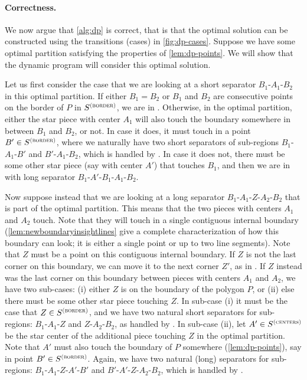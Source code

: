 \documentclass[10pt,a4paper]{article}
\newcommand\Scen{S^{\textsc{(centers)}}}
\newcommand\Sbor{S^{\textsc{(border)}}}
\begin{document}
\paragraph{Correctness.}
We now argue that \cref{alg:dp} is correct, that is that the optimal solution can be constructed using the transitions (cases) in \cref{fig:dp-cases}.
Suppose we have some optimal partition satisfying the properties of \cref{lem:dp-points}. We will show that the dynamic program will consider this optimal solution.

Let us first consider the case that we are looking at a short separator $B_1$-$A_1$-$B_2$ in this optimal partition. If either $B_1 = B_2$ or $B_1$ and $B_2$ are consecutive points on the border of $P$ in $\Sbor$, we are in . Otherwise, in the optimal partition, either the star piece with center $A_1$ will also touch the boundary somewhere in between $B_1$ and $B_2$, or not. In case it does, it must touch in a point $B'\in \Sbor$, where we naturally have two short separators of sub-regions $B_1$-$A_1$-$B'$ and $B'$-$A_1$-$B_2$, which is handled by . In case it does not, there must be some other star piece (say with center $A'$) that touches $B_1$, and then we are in  with long separator $B_1$-$A'$-$B_1$-$A_1$-$B_2$.

Now suppose instead that we are looking at a long separator $B_1$-$A_1$-$Z$-$A_2$-$B_2$ that is part of the optimal partition. This means that the two pieces with centers $A_1$ and $A_2$ touch. Note that they will touch in a single contiguous internal boundary (\cref{lem:newboundaryinsightlines} give a complete characterization of how this boundary can look; it is either a single point or up to two line segments). Note that $Z$ must be a point on this contiguous internal boundary. If $Z$ is not the last corner on this boundary, we can move it to the next corner $Z'$, as in . If $Z$ instead was the last corner on this boundary between pieces with centers $A_1$ and $A_2$, we have two sub-cases: (i) either $Z$ is on the boundary of the polygon $P$, or (ii) else there must be some other star piece touching $Z$. In sub-case (i) it must be the case that $Z\in \Sbor$, and we have two natural short separators for sub-regions: $B_1$-$A_1$-$Z$ and $Z$-$A_2$-$B_2$, as handled by . In sub-case (ii), let $A'\in \Scen$ be the star center of the additional piece touching $Z$ in the optimal partition. Note that $A'$ must also touch the boundary of $P$ somewhere (\cref{lem:dp-points}), say in point $B'\in \Sbor$. Again, we have two natural (long) separators for sub-regions: $B_1$-$A_1$-$Z$-$A'$-$B'$ and $B'$-$A'$-$Z$-$A_2$-$B_2$, which is handled by .
\end{document}
